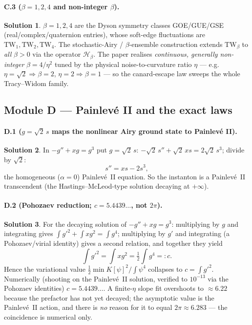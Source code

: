 \documentclass[11pt]{article}
\newcommand{\TW}{\mathrm{TW}}
\theoremstyle{definition}
\newtheorem*{sol}{Solution}
\begin{document}
\paragraph{C.3 ($\beta=1,2,4$ and non-integer $\beta$).}
\begin{sol}
$\beta=1,2,4$ are the Dyson symmetry classes GOE/GUE/GSE (real/complex/quaternion entries), whose
soft-edge fluctuations are $\TW_1,\TW_2,\TW_4$. The stochastic-Airy / $\beta$-ensemble construction
extends $\TW_\beta$ to \emph{all} $\beta>0$ via the operator $\mathcal H_\beta$. The paper realises
\emph{continuous, generally non-integer} $\beta=4/\eta^2$ tuned by the physical noise-to-curvature
ratio $\eta$ --- e.g.\ $\eta=\sqrt2\Rightarrow\beta=2$, $\eta=2\Rightarrow\beta=1$ --- so the
canard-escape law sweeps the whole Tracy--Widom family.
\end{sol}

\subsection*{Module D --- Painlev\'e II and the exact laws}

\paragraph{D.1 ($g=\sqrt2\,s$ maps the nonlinear Airy ground state to Painlev\'e II).}
\begin{sol}
In $-g''+xg=g^3$ put $g=\sqrt2\,s$: $-\sqrt2\,s''+\sqrt2\,x s=2\sqrt2\,s^3$; divide by $\sqrt2$:
\[
s''=x s-2s^3,
\]
the homogeneous ($\alpha=0$) Painlev\'e~II equation. So the instanton is a Painlev\'e~II
transcendent (the Hastings--McLeod-type solution decaying at $+\infty$).
\end{sol}

\paragraph{D.2 (Pohozaev reduction; $c=5.4439\ldots$, not $2\pi$).}
\begin{sol}
For the decaying solution of $-g''+xg=g^3$: multiplying by $g$ and integrating gives
$\int g'^2+\int x g^2=\int g^4$; multiplying by $g'$ and integrating (a Pohozaev/virial identity)
gives a second relation, and together they yield
\[
\int g'^2=\int x g^2=\tfrac12\int g^4=:c.
\]
Hence the variational value $\tfrac12\min K[\psi]^2/\!\int\psi^4$ collapses to $c=\int g'^2$.
Numerically (shooting on the Painlev\'e~II solution, verified to $10^{-13}$ via the Pohozaev
identities) $c=5.4439\ldots$. A finite-$\eta$ slope fit overshoots to $\approx6.22$ because the
prefactor has not yet decayed; the asymptotic value is the Painlev\'e~II action, and there is
\emph{no} reason for it to equal $2\pi\approx6.283$ --- the coincidence is numerical only.
\end{sol}
\end{document}
